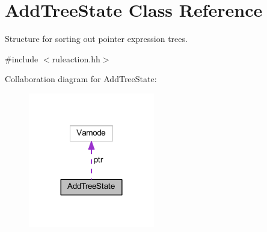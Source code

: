 \hypertarget{class_add_tree_state}{}\section{Add\+Tree\+State Class Reference}
\label{class_add_tree_state}


Structure for sorting out pointer expression trees.  




{\ttfamily \#include $<$ruleaction.\+hh$>$}



Collaboration diagram for Add\+Tree\+State\+:
\nopagebreak
\begin{figure}[H]
\begin{center}
\leavevmode
\includegraphics[width=156pt]{class_add_tree_state__coll__graph}
\end{center}
\end{figure}
